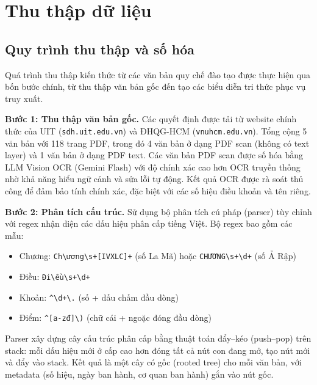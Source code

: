 \section{Thu thập dữ liệu}
\label{sec:thuthap_kienthuc}

\subsection{Quy trình thu thập và số hóa}
\label{subsec:quytrinh_thuthap}

Quá trình thu thập kiến thức từ các văn bản quy chế đào tạo được thực hiện qua bốn
bước chính, từ thu thập văn bản gốc đến tạo các biểu diễn tri thức phục vụ truy
xuất.

\textbf{Bước 1: Thu thập văn bản gốc.}
Các quyết định được tải từ website chính thức của UIT
(\texttt{sdh.uit.edu.vn}) và ĐHQG-HCM (\texttt{vnuhcm.edu.vn}). Tổng
cộng 5 văn bản với 118 trang PDF, trong đó 4 văn bản ở dạng PDF scan (không có text
layer) và 1 văn bản ở dạng PDF text. Các văn bản PDF scan được số hóa bằng LLM
Vision OCR (Gemini Flash) với độ chính xác cao hơn OCR truyền thống nhờ khả năng
hiểu ngữ cảnh và sửa lỗi tự động. Kết quả OCR được rà soát thủ công để đảm
bảo tính chính xác, đặc biệt với các số hiệu điều khoản và tên riêng.

\textbf{Bước 2: Phân tích cấu trúc.}
Sử dụng bộ phân tích cú pháp (parser) tùy chỉnh với regex nhận diện các dấu hiệu
phân cấp tiếng Việt. Bộ regex bao gồm các mẫu:

\begin{itemize}
  \item Chương: \texttt{Ch\textbackslash ương\textbackslash s+[IVXLC]+} (số La Mã)
        hoặc \texttt{CHƯƠNG\textbackslash s+\textbackslash d+} (số Ả Rập)
  \item Điều: \texttt{Đi\textbackslash ều\textbackslash s+\textbackslash d+}
  \item Khoản: \texttt{\textasciicircum\textbackslash d+\textbackslash .} (số + dấu chấm đầu
        dòng)
  \item Điểm: \texttt{\textasciicircum[a-zđ]\textbackslash )} (chữ cái + ngoặc đóng đầu dòng)
\end{itemize}

Parser xây dựng cây cấu trúc phân cấp bằng thuật toán đẩy--kéo (push--pop) trên
stack: mỗi dấu hiệu mới ở cấp cao hơn đóng tất cả nút con đang mở, tạo nút mới
và đẩy vào stack. Kết quả là một cây có gốc (rooted tree) cho mỗi văn bản, với
metadata (số hiệu, ngày ban hành, cơ quan ban hành) gắn vào nút gốc.

